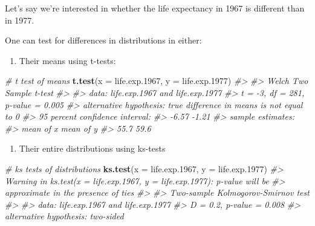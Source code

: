 \documentclass[]{book}
\newenvironment{Shaded}{\begin{snugshade}}{\end{snugshade}}
\newcommand{\KeywordTok}[1]{\textcolor[rgb]{0.13,0.29,0.53}{\textbf{#1}}}
\newcommand{\DataTypeTok}[1]{\textcolor[rgb]{0.13,0.29,0.53}{#1}}
\newcommand{\DecValTok}[1]{\textcolor[rgb]{0.00,0.00,0.81}{#1}}
\newcommand{\StringTok}[1]{\textcolor[rgb]{0.31,0.60,0.02}{#1}}
\newcommand{\CommentTok}[1]{\textcolor[rgb]{0.56,0.35,0.01}{\textit{#1}}}
\newcommand{\OperatorTok}[1]{\textcolor[rgb]{0.81,0.36,0.00}{\textbf{#1}}}
\newcommand{\NormalTok}[1]{#1}
\providecommand{\tightlist}{%
  \setlength{\itemsep}{0pt}\setlength{\parskip}{0pt}}
\begin{document}
Let's say we're interested in whether the life expectancy in 1967 is
different than in 1977.

\begin{Shaded}
\end{Shaded}

One can test for differences in distributions in either:

\begin{enumerate}
\def\labelenumi{\arabic{enumi})}
\tightlist
\item
  Their means using t-tests:
\end{enumerate}

\begin{Shaded}
\begin{Highlighting}[]
\CommentTok{# t test of means}
\KeywordTok{t.test}\NormalTok{(}\DataTypeTok{x =}\NormalTok{ life.exp.}\DecValTok{1967}\NormalTok{, }\DataTypeTok{y =}\NormalTok{ life.exp.}\DecValTok{1977}\NormalTok{)}
\CommentTok{#> }
\CommentTok{#>  Welch Two Sample t-test}
\CommentTok{#> }
\CommentTok{#> data:  life.exp.1967 and life.exp.1977}
\CommentTok{#> t = -3, df = 281, p-value = 0.005}
\CommentTok{#> alternative hypothesis: true difference in means is not equal to 0}
\CommentTok{#> 95 percent confidence interval:}
\CommentTok{#>  -6.57 -1.21}
\CommentTok{#> sample estimates:}
\CommentTok{#> mean of x mean of y }
\CommentTok{#>      55.7      59.6}
\end{Highlighting}
\end{Shaded}

\begin{enumerate}
\def\labelenumi{\arabic{enumi})}
\setcounter{enumi}{1}
\tightlist
\item
  Their entire distributions using ks-tests
\end{enumerate}

\begin{Shaded}
\begin{Highlighting}[]
\CommentTok{# ks tests of distributions}
\KeywordTok{ks.test}\NormalTok{(}\DataTypeTok{x =}\NormalTok{ life.exp.}\DecValTok{1967}\NormalTok{, }\DataTypeTok{y =}\NormalTok{ life.exp.}\DecValTok{1977}\NormalTok{)}
\CommentTok{#> Warning in ks.test(x = life.exp.1967, y = life.exp.1977): p-value will be}
\CommentTok{#> approximate in the presence of ties}
\CommentTok{#> }
\CommentTok{#>  Two-sample Kolmogorov-Smirnov test}
\CommentTok{#> }
\CommentTok{#> data:  life.exp.1967 and life.exp.1977}
\CommentTok{#> D = 0.2, p-value = 0.008}
\CommentTok{#> alternative hypothesis: two-sided}
\end{Highlighting}
\end{Shaded}
\end{document}

